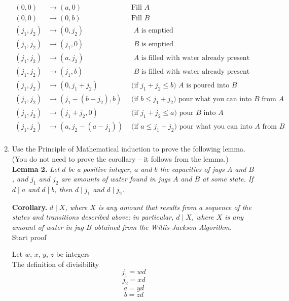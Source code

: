 \documentclass[10pt, AMS Euler]{article}
\begin{document}
\begin{enumerate}
		\begin{align*} (0,0) & \to  (a,0) &\mbox{ Fill $A$} \\
			(0,0)  & \to  (0,b) & \mbox{ Fill $B$}\\
			(j_1, j_2) & \to  (0,j_2)  & \mbox{ $A$ is emptied}\\
			(j_1,j_2) & \to  (j_1,0)  & \mbox{ $B$ is emptied}\\
			(j_1,j_2) & \to  (a, j_2) & \mbox{ $A$ is filled with water already present}\\
			(j_1,j_2) & \to  (j_1, b)  & \mbox{ $B$ is filled with water already present}\\
			(j_1,j_2) & \to  (0, j_1+j_2) & \mbox{ (if  $j_1+j_2 \leq b$) $A$ is poured into $B$} \\
			(j_1, j_2) & \to  (j_1 -(b - j_2), b) & \mbox{ (if $b \leq j_1 + j_2$) pour what you can into $B$ from $A$}  \\
			(j_1,j_2) & \to  (j_1+j_2,0) & \mbox{ (if  $j_1+j_2 \leq a$) pour $B$ into $A$} \\
			(j_1, j_2) & \to  (a, j_2 - (a - j_1)) & \mbox{ (if $a \leq j_1 + j_2$)  pour what you can into $A$ from $B$} \\
		\end{align*}
		
		\item Use the Principle of Mathematical induction to prove the following lemma. (You do not need to prove the corollary -- it follows from the lemma.) \\
		
		{\bf Lemma 2.} \emph{Let $d$ be a positive integer, $a$ and $b$ the capacities of jugs $A$ and $B$, and $j_1$ and $j_2$ are amounts of water found in jugs $A$ and $B$ at some state. If $d \mid a$ and $d \mid b$, then $d \mid j_1$ and $d \mid j_2$.} 
		
		{\bf Corollary.} \emph{$d \mid X$, where $X$ is any
			amount that results from a sequence of the states and transitions described above; in particular,  $d \mid X$, where $X$ is any amount of water in jug $B$ obtained from the Willis-Jackson Algorithm.}\\

            Start proof
            
                Let $w$, $x$, $y$, $z$ be integers \\
                The definition of divisibility \\
                $$ j_1 = wd $$
                $$ j_2 = xd $$
                $$ a = yd $$
                $$ b = zd $$
                

\end{enumerate}
\end{document}

